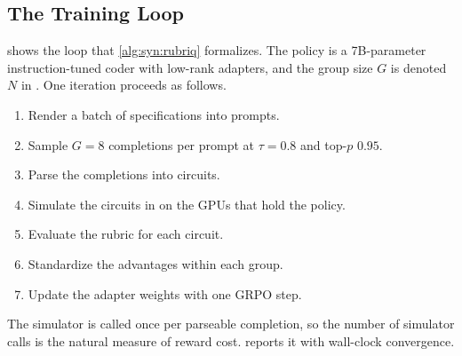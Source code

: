 \subsection{The Training Loop}\label{sec:syn:loop}

 shows the loop that \cref{alg:syn:rubriq} formalizes. The policy is a 7B-parameter instruction-tuned coder with low-rank adapters, and the group size $G$ is denoted $N$ in \cite{guo2026rubriq}. One iteration proceeds as follows.
\begin{enumerate}
  \item Render a batch of specifications into prompts.
  \item Sample $G=8$ completions per prompt at $\tau=0.8$ and top-$p$ $0.95$.
  \item Parse the completions into circuits.
  \item Simulate the circuits in \cudaq{} on the GPUs that hold the policy.
  \item Evaluate the rubric for each circuit.
  \item Standardize the advantages within each group.
  \item Update the adapter weights with one GRPO step.
\end{enumerate}
The simulator is called once per parseable completion, so the number of simulator calls is the natural measure of reward cost.  reports it with wall-clock convergence.

